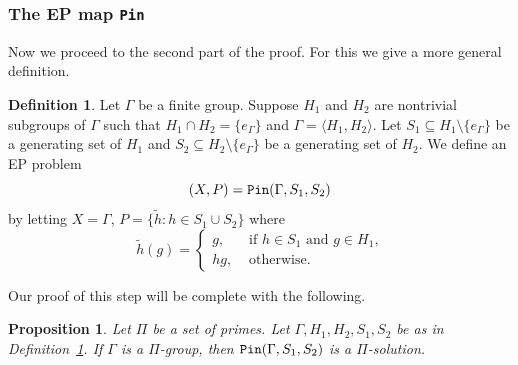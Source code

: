 \documentclass[10pt,a4paper]{amsart}
\newtheorem{proposition}[theorem]{Proposition}
\theoremstyle{definition}
\newtheorem{definition}[theorem]{Definition}
\theoremstyle{definition}
\numberwithin{equation}{section}
\begin{document}
\subsubsection{The EP map {\tt Pin}}

Now we proceed to the second part of the proof. For this we give a more general definition.

\begin{definition} \label{def:Pin} Let $\Gamma$ be a finite group. Suppose $H_1$ and $H_2$ are nontrivial subgroups of $\Gamma$ such that
$H_1\cap H_2=\{e_\Gamma\}$ and $\Gamma=\langle H_1, H_2\rangle$. Let $S_1\subseteq H_1\setminus \{e_\Gamma\}$ be a generating set of $H_1$ and $S_2\subseteq H_2\setminus\{e_\Gamma\}$ be a generating set of $H_2$. We define an EP problem
$$ (X, P)={\tt Pin} (\Gamma, S_1, S_2) $$
by letting $X=\Gamma$, $P=\big\{ \tilde{h}\colon h\in S_1\cup S_2\big\}$ where
$$ \tilde{h}(g)=\left\{\begin{array}{ll} g, & \mbox{ if $h\in S_1$ and $g\in H_1$,} \\
hg, & \mbox{ otherwise.}
\end{array}\right.
$$
\end{definition}

Our proof of this step will be complete with the following.

\begin{proposition} Let $\Pi$ be a set of primes. Let $\Gamma, H_1, H_2, S_1, S_2$ be as in Definition~\ref{def:Pin}. If $\Gamma$ is a $\Pi$-group, then $\mbox{\tt Pin}(\Gamma, S_1, S_2)$ is a $\Pi$-solution.
\end{proposition}
\end{document}
